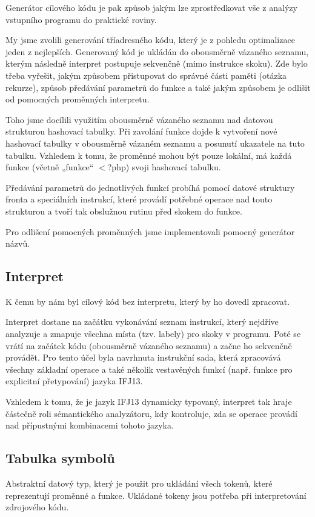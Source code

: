 \documentclass[12pt,a4paper]{article}
\begin{document}
Generátor cílového kódu je pak způsob jakým lze zprostředkovat vše z analýzy vstupního programu do praktické roviny.

My jsme zvolili generování tříadresného kódu, který je z pohledu optimalizace jeden z nejlepších. Generovaný kód je ukládán do obousměrně vázaného seznamu, kterým následně interpret postupuje sekvenčně (mimo instrukce skoku).
Zde bylo třeba vyřešit, jakým způsobem přistupovat do správné části paměti (otázka rekurze), způsob předávání parametrů do funkce a také jakým způsobem je odlišit od pomocných proměnných interpretu. 

Toho jsme docílili využitím obousměrně vázaného seznamu nad datovou strukturou hashovací tabulky. Při zavolání funkce dojde k vytvoření nové hashovací tabulky v obousměrně vázaném seznamu a posunutí ukazatele na tuto tabulku. Vzhledem k tomu, že proměnné mohou být pouze lokální, má každá funkce (včetně „funkce“ $<$?php) svoji hashovací tabulku. 

Předávání parametrů do jednotlivých funkcí probíhá pomocí datové struktury fronta a speciálních instrukcí, které provádí potřebné operace nad touto strukturou a tvoří tak obslužnou rutinu před skokem do funkce. 

Pro odlišení pomocných proměnných jsme implementovali pomocný generátor názvů.  

\subsection{Interpret}
K čemu by nám byl cílový kód bez interpretu, který by ho dovedl zpracovat.

Interpret dostane na začátku vykonávání seznam instrukcí, který nejdříve analyzuje a zmapuje všechna místa (tzv. labely) pro skoky v programu. Poté se vrátí na začátek kódu (obousměrně vázaného seznamu) a začne ho sekvenčně provádět. Pro tento účel byla navrhnuta instrukční sada, která zpracovává všechny základní operace a také několik vestavěných funkcí (např. funkce pro explicitní přetypování) jazyka IFJ13.

Vzhledem k tomu, že je jazyk IFJ13 dynamicky typovaný, interpret tak hraje částečně roli sémantického analyzátoru, kdy kontroluje, zda se operace provádí nad přípustnými kombinacemi tohoto jazyka. 


\subsection{Tabulka symbolů}
Abstraktní datový typ, který je použit pro ukládání všech tokenů, které reprezentují proměnné a funkce. Ukládané tokeny jsou potřeba při interpretování zdrojového kódu.
\end{document}
